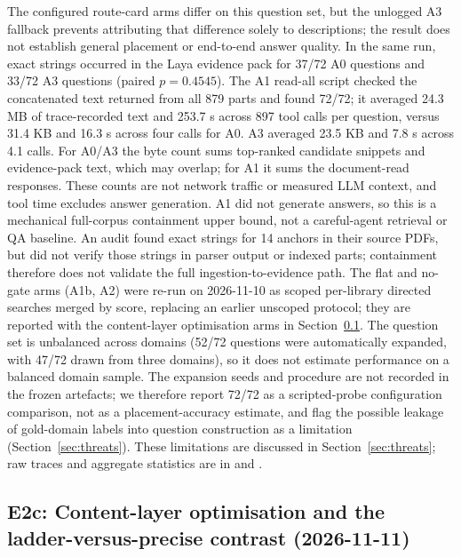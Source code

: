 The configured route-card arms differ on this question set, but the unlogged
A3 fallback prevents attributing that difference solely to descriptions; the
result does not establish general placement or end-to-end answer quality. In
the same run, exact strings occurred in the Laya evidence pack for 37/72 A0
questions and 33/72 A3 questions (paired $p=0.4545$). The A1 read-all script
checked the concatenated text returned from all 879 parts and found 72/72; it
averaged 24.3 MB of trace-recorded text and 253.7 s across 897 tool calls per
question, versus 31.4 KB and 16.3 s across four calls for A0. A3 averaged
23.5 KB and 7.8 s across 4.1 calls. For A0/A3 the byte count sums top-ranked
candidate snippets and evidence-pack text, which may overlap; for A1 it sums
the document-read responses. These counts are not network traffic or measured
LLM context, and tool time excludes answer generation. A1 did not generate
answers, so this is a mechanical full-corpus containment upper bound, not a
careful-agent retrieval or QA baseline. An audit found
exact strings for 14 anchors in their source PDFs, but did not verify those
strings in parser output or indexed parts; containment therefore does not
validate the full ingestion-to-evidence path. The flat and no-gate arms
(A1b, A2) were re-run on 2026-11-10 as scoped per-library directed searches
merged by score, replacing an earlier unscoped protocol; they are reported
with the content-layer optimisation arms in Section~\ref{sec:ladder-opt}.
The question set is unbalanced across
domains (52/72 questions were automatically expanded, with 47/72 drawn from
three domains), so it does not estimate performance on a balanced domain
sample. The expansion seeds and procedure are not recorded in the frozen
artefacts; we therefore report 72/72 as a scripted-probe configuration
comparison, not as a placement-accuracy estimate, and flag the possible
leakage of gold-domain labels into question construction as a limitation
(Section~\ref{sec:threats}). These limitations are discussed in Section~\ref{sec:threats}; raw
traces and aggregate statistics are in
and .

\subsection{E2c: Content-layer optimisation and the ladder-versus-precise
contrast (2026-11-11)}
\label{sec:ladder-opt}

